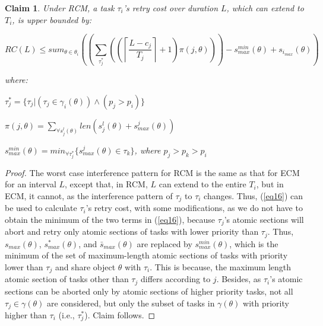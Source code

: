 \documentclass[12pt,english]{report}
\newtheorem{clm}{Claim}
\newtheorem{proof}{Proof}
\begin{document}
\begin{clm}\label{clm:rcm_retry_cost}
Under RCM, a task $\tau_i$'s retry cost over duration $L$, which can extend to $T_i$, is upper bounded by:
 
\begin{equation}
RC\left(L\right) \le sum_{\theta\in\theta_{i}}\left(\left(\sum_{\tau_{j}^{*}}\left(\left(\left\lceil\frac{L-c_{j}}{T_{j}}\right\rceil+1\right)\pi\left(j,\theta\right)\right)\right) - s_{max}^{min}\left(\theta\right)+s_{i_{max}}\left(\theta\right)\right)\label{eq20}\end{equation} 
 
 where:
 \begin{compactitem}
\item $\tau_{j}^{*}=\{\tau_{j}|(\tau_{j}\in\gamma_i(\theta))\wedge(p_{j}> p_{i})\}$
\item $\pi(j,\theta)=\sum_{\forall s_{j}^{l}(\theta)}len\left(s_{j}^{l}\left(\theta\right)+s_{max}^{j}\left(\theta\right)\right)$
\item $s_{max}^{min}(\theta)=min_{\forall \tau_j^*} \{s_{max}^j(\theta) \in \tau_k \}$, where $p_j > p_k > p_i$
\end{compactitem}
\end{clm}
\begin{proof}\normalfont
The worst case interference pattern for RCM is the same as that for ECM for an interval $L$, except that, in RCM, $L$ can extend to the entire $T_i$, but in ECM, it cannot, as the interference pattern of $\tau_j$ to $\tau_i$ changes. 
Thus, (\ref{eq16}) can be used to calculate $\tau_i$'s retry cost, with some modifications, as we do not have to obtain the minimum of the two terms in (\ref{eq16}), because $\tau_j$'s atomic sections will abort and retry only atomic sections of tasks with lower priority than $\tau_j$. Thus, $s_{max}(\theta)$, $s_{max}^*(\theta)$, and $\bar{s}_{max}(\theta)$ are replaced by $s_{max}^{min}(\theta)$, which is the minimum of the set of maximum-length atomic sections of tasks with priority lower than $\tau_j$ and share object $\theta$ with $\tau_i$. This is because, the maximum length atomic section of tasks other than $\tau_j$ differs according to $j$. Besides, as $\tau_i$'s atomic sections can be aborted only by atomic sections of higher priority tasks, not all $\tau_j \in \gamma (\theta)$ are considered, but only the subset of tasks in $\gamma (\theta)$ with priority higher than $\tau_i$ (i.e., $\tau_j^*$). 
Claim follows.
\end{proof}
\end{document}
